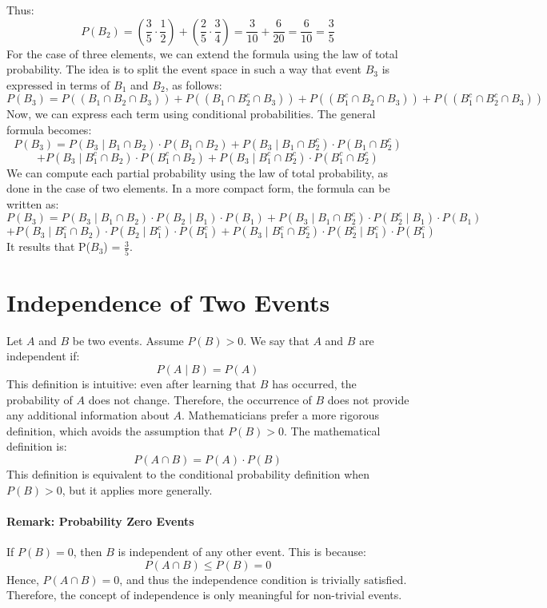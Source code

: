     Thus:
    \[
    P(B_2) = \left(\frac{3}{5} \cdot \frac{1}{2}\right) + \left(\frac{2}{5} \cdot \frac{3}{4}\right) = \frac{3}{10} + \frac{6}{20} = \frac{6}{10} = \frac{3}{5}
    \]
    For the case of three elements, we can extend the formula using the law of total probability. The idea is to split the event space in such a way that event \( B_3 \) is expressed in terms of \( B_1 \) and \( B_2 \), as follows:
    \[
    P(B_3) = P((B_1 \cap B_2 \cap B_3)) + P((B_1 \cap B_2^c \cap B_3)) + P((B_1^c \cap B_2 \cap B_3)) + P((B_1^c \cap B_2^c \cap B_3))
    \]
    Now, we can express each term using conditional probabilities. \newline
    The general formula becomes:
    \[
    P(B_3) = P(B_3 \mid B_1 \cap B_2) \cdot P(B_1 \cap B_2) + P(B_3 \mid B_1 \cap B_2^c) \cdot P(B_1 \cap B_2^c)
    \]
    \[
    + P(B_3 \mid B_1^c \cap B_2) \cdot P(B_1^c \cap B_2) + P(B_3 \mid B_1^c \cap B_2^c) \cdot P(B_1^c \cap B_2^c)
    \]
    We can compute each partial probability using the law of total probability, as done in the case of two elements.\newline
    In a more compact form, the formula can be written as:
    \[
    P(B_3) = P(B_3 \mid B_1 \cap B_2) \cdot P(B_2 \mid B_1) \cdot P(B_1) + P(B_3 \mid B_1 \cap B_2^c) \cdot P(B_2^c \mid B_1) \cdot P(B_1)
    \]
    \[
    + P(B_3 \mid B_1^c \cap B_2) \cdot P(B_2 \mid B_1^c) \cdot P(B_1^c) + P(B_3 \mid B_1^c \cap B_2^c) \cdot P(B_2^c \mid B_1^c) \cdot P(B_1^c)
    \]
    It results that P($B_3$) = $\frac{3}{5}$.

    \section{Independence of Two Events}
    Let $A$ and $B$ be two events. Assume ${P}(B) > 0$. We say that $A$ and $B$ are independent if:
    \[
    {P}(A \mid B) = {P}(A)
    \]
    This definition is intuitive: even after learning that $B$ has occurred, the probability of $A$ does not change. Therefore, the occurrence of $B$ does not provide any additional information about $A$. Mathematicians prefer a more rigorous definition, which avoids the assumption that ${P}(B) > 0$. The mathematical definition is:
    \[
    {P}(A \cap B) = {P}(A) \cdot {P}(B)
    \]
    This definition is equivalent to the conditional probability definition when ${P}(B) > 0$, but it applies more generally.
    
    \paragraph{Remark: Probability Zero Events}
    If ${P}(B) = 0$, then $B$ is independent of any other event. This is because:
    \[
    {P}(A \cap B) \leq {P}(B) = 0
    \]
    Hence, ${P}(A \cap B) = 0$, and thus the independence condition is trivially satisfied. Therefore, the concept of independence is only meaningful for non-trivial events.
    
